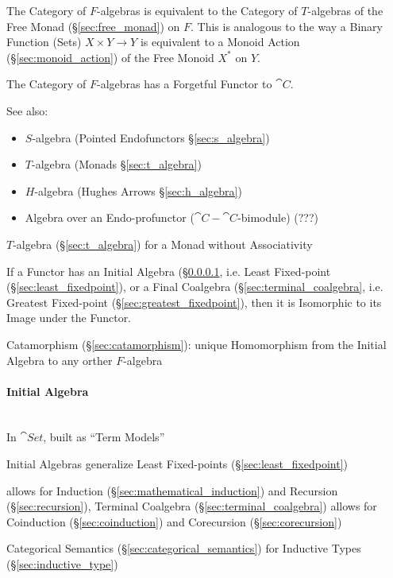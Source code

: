 The Category of $F$-algebras is equivalent to the Category of
$T$-algebras of the Free Monad (\S\ref{sec:free_monad}) on $F$. This
is analogous to the way a Binary Function (Sets) $X \times Y
\rightarrow Y$ is equivalent to a Monoid Action
(\S\ref{sec:monoid_action}) of the Free Monoid $X^*$ on $Y$.

The Category of $F$-algebras has a Forgetful Functor to $\cat{C}$.

\fist See also:
\begin{itemize}
  \item $S$-algebra (Pointed Endofunctors \S\ref{sec:s_algebra})
  \item $T$-algebra (Monads \S\ref{sec:t_algebra})
  \item $H$-algebra (Hughes Arrows \S\ref{sec:h_algebra})
  \item Algebra over an Endo-profunctor ($\cat{C}-\cat{C}$-bimodule)
    (???) %
\end{itemize}

$T$-algebra (\S\ref{sec:t_algebra}) for a Monad without Associativity

If a Functor has an Initial Algebra (\S\ref{sec:initial_algebra},
i.e. Least Fixed-point (\S\ref{sec:least_fixedpoint}), or a Final
Coalgebra (\S\ref{sec:terminal_coalgebra}, i.e. Greatest Fixed-point
(\S\ref{sec:greatest_fixedpoint}), then it is Isomorphic to its Image
under the Functor. \cite{corfield08}

Catamorphism (\S\ref{sec:catamorphism}): unique Homomorphism from the
Initial Algebra to any orther $F$-algebra



\paragraph{Initial Algebra}\label{sec:initial_algebra}
\hfill \\

In $\cat{Set}$, built as ``Term Models'' \cite{corfield08} %

Initial Algebras generalize Least Fixed-points
(\S\ref{sec:least_fixedpoint}) \cite{rutten00}

allows for Induction (\S\ref{sec:mathematical_induction}) and
Recursion (\S\ref{sec:recursion}), Terminal Coalgebra
(\S\ref{sec:terminal_coalgebra}) allows for Coinduction
(\S\ref{sec:coinduction}) and Corecursion (\S\ref{sec:corecursion})

Categorical Semantics (\S\ref{sec:categorical_semantics}) for
Inductive Types (\S\ref{sec:inductive_type})

